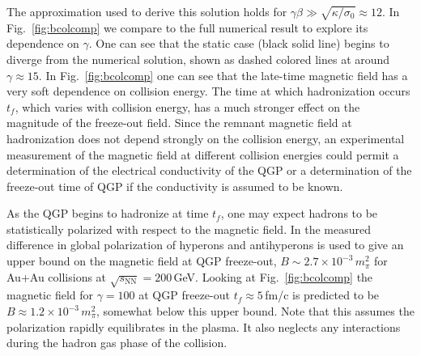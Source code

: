 The approximation used to derive this solution holds for $\gamma\beta \gg \sqrt{ \kappa/\sigma_0} \approx 12$. In Fig.~\ref{fig:bcolcomp} we compare  to the full numerical result to explore its dependence on $\gamma$.  One can see that the static case  (black solid line) begins to diverge from the numerical solution, shown as dashed colored lines at around $\gamma \approx 15$.  In Fig.~\ref{fig:bcolcomp} one can see that the late-time magnetic field has a very soft dependence on collision energy. The time at which hadronization occurs $t_f$, which varies with collision energy, has a much stronger effect on the magnitude of the freeze-out field. Since the remnant magnetic field at hadronization does not depend strongly on the collision energy, an experimental measurement of the magnetic field at different collision energies could permit a determination of the electrical conductivity of the QGP or a determination of the freeze-out time of QGP if the conductivity is assumed to be known. 

As the QGP begins to hadronize at time $t_f$, one may expect hadrons to be statistically polarized with respect to the magnetic field. In \cite{Muller:2018ibh} the measured difference in global polarization of hyperons and antihyperons is used to give an upper bound on the magnetic field at QGP freeze-out, $B \sim 2.7\times 10^{-3}\,m_{\pi}^2$ for Au+Au collisions at $\sqrt{s_\text{NN}} = 200$\,GeV. Looking at Fig.~\ref{fig:bcolcomp} the magnetic field for $\gamma = 100$ at QGP freeze-out $t_f \approx 5 $\,fm/c is predicted to be $B \approx 1.2\times 10^{-3}\,m_{\pi}^2$, somewhat below this upper bound. Note that this assumes the polarization rapidly equilibrates in the plasma. It also neglects any interactions during the hadron gas phase of the collision. 


